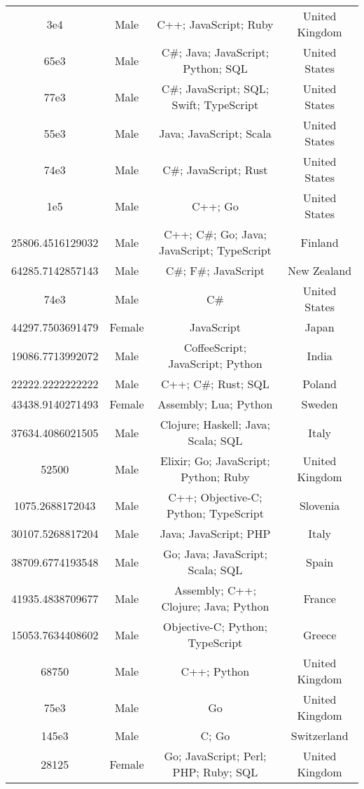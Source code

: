 \begin{center}
\begin{tabular}{ |c|c|c|c| }
3e4  &  Male  &  C++; JavaScript; Ruby  &  United Kingdom  \\ 
65e3  &  Male  &  C\#; Java; JavaScript; Python; SQL  &  United States  \\ 
77e3  &  Male  &  C\#; JavaScript; SQL; Swift; TypeScript  &  United States  \\ 
55e3  &  Male  &  Java; JavaScript; Scala  &  United States  \\ 
74e3  &  Male  &  C\#; JavaScript; Rust  &  United States  \\ 
1e5  &  Male  &  C++; Go  &  United States  \\ 
25806.4516129032  &  Male  &  C++; C\#; Go; Java; JavaScript; TypeScript  &  Finland  \\ 
64285.7142857143  &  Male  &  C\#; F\#; JavaScript  &  New Zealand  \\ 
74e3  &  Male  &  C\#  &  United States  \\ 
44297.7503691479  &  Female  &  JavaScript  &  Japan  \\ 
19086.7713992072  &  Male  &  CoffeeScript; JavaScript; Python  &  India  \\ 
22222.2222222222  &  Male  &  C++; C\#; Rust; SQL  &  Poland  \\ 
43438.9140271493  &  Female  &  Assembly; Lua; Python  &  Sweden  \\ 
37634.4086021505  &  Male  &  Clojure; Haskell; Java; Scala; SQL  &  Italy  \\ 
52500  &  Male  &  Elixir; Go; JavaScript; Python; Ruby  &  United Kingdom  \\ 
1075.2688172043  &  Male  &  C++; Objective-C; Python; TypeScript  &  Slovenia  \\ 
30107.5268817204  &  Male  &  Java; JavaScript; PHP  &  Italy  \\ 
38709.6774193548  &  Male  &  Go; Java; JavaScript; Scala; SQL  &  Spain  \\ 
41935.4838709677  &  Male  &  Assembly; C++; Clojure; Java; Python  &  France  \\ 
15053.7634408602  &  Male  &  Objective-C; Python; TypeScript  &  Greece  \\ 
68750  &  Male  &  C++; Python  &  United Kingdom  \\ 
75e3  &  Male  &  Go  &  United Kingdom  \\ 
145e3  &  Male  &  C; Go  &  Switzerland  \\ 
28125  &  Female  &  Go; JavaScript; Perl; PHP; Ruby; SQL  &  United Kingdom  \\ 

\end{tabular}
\end{center}
